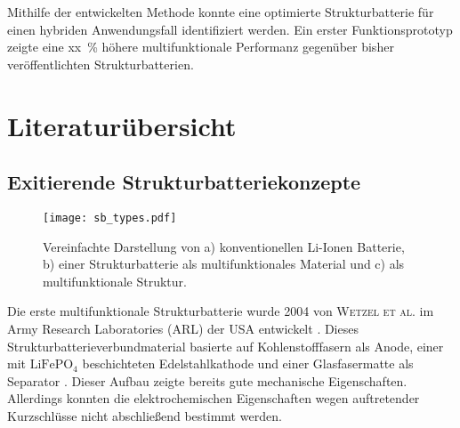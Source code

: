 Mithilfe der entwickelten Methode konnte eine optimierte Strukturbatterie für einen hybriden Anwendungsfall identifiziert werden. Ein erster Funktionsprototyp zeigte eine xx~\% höhere multifunktionale Performanz gegenüber bisher veröffentlichten Strukturbatterien.



\section{\label{sec:Literaturübersicht}Literaturübersicht}

\subsection{Exitierende Strukturbatteriekonzepte}

\begin{figure}[h]
        \center
	\texttt{[image: sb\_types.pdf]}
		\caption{\label{fig:sb_types}Vereinfachte Darstellung von a) konventionellen Li-Ionen Batterie, b) einer Strukturbatterie als multifunktionales Material und c) als multifunktionale Struktur.}
\end{figure}

Die erste multifunktionale Strukturbatterie wurde 2004 von \textsc{Wetzel et al.} im Army Research Laboratories (ARL) der USA entwickelt \cite{Wetzel2004, Snyder2006, Wong2007, Snyder2007}. Dieses Strukturbatterieverbundmaterial basierte auf Kohlenstofffasern als Anode, einer mit $\text{LiFePO}_\text{4}$ beschichteten Edelstahlkathode und einer Glasfasermatte als Separator \cite{Wong2007}. Dieser Aufbau zeigte bereits gute mechanische Eigenschaften. Allerdings konnten die elektrochemischen Eigenschaften wegen auftretender Kurzschlüsse nicht abschließend bestimmt werden.

